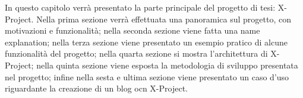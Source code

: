 In questo capitolo verrà presentato la parte principale del progetto di tesi: X-Project.
Nella prima sezione verrà effettuata una panoramica sul progetto, con motivazioni e funzionalità; nella seconda sezione viene fatta una name explanation; nella terza sezione viene presentato un esempio pratico di alcune funzionalità del progetto; nella quarta sezione si mostra l'architettura di X-Project; nella quinta sezione viene esposta la metodologia di sviluppo presentata nel progetto; infine nella sesta e ultima sezione viene presentato un caso d'uso riguardante la creazione di un blog ocn X-Project.
